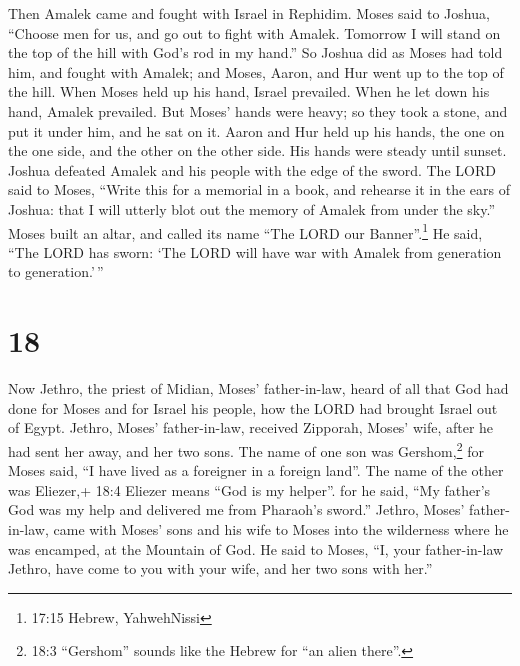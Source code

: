  Then Amalek came and fought with Israel in Rephidim.
 Moses said to Joshua, ``Choose men for us, and go out to
fight with Amalek. Tomorrow I will stand on the top of the hill with
God's rod in my hand.''  So Joshua did as Moses had told
him, and fought with Amalek; and Moses, Aaron, and Hur went up to the
top of the hill.  When Moses held up his hand, Israel
prevailed. When he let down his hand, Amalek prevailed. 
But Moses' hands were heavy; so they took a stone, and put it under him,
and he sat on it. Aaron and Hur held up his hands, the one on the one
side, and the other on the other side. His hands were steady until
sunset.  Joshua defeated Amalek and his people with the
edge of the sword.  The LORD said to Moses, ``Write this
for a memorial in a book, and rehearse it in the ears of Joshua: that I
will utterly blot out the memory of Amalek from under the sky.''
 Moses built an altar, and called its name ``The LORD our
Banner''.\footnote{17:15 Hebrew, YahwehNissi}  He said,
``The LORD has sworn: `The LORD will have war with Amalek from
generation to generation.'\,''

\hypertarget{section-17}{%
\section{18}\label{section-17}}

 Now Jethro, the priest of Midian, Moses' father-in-law,
heard of all that God had done for Moses and for Israel his people, how
the LORD had brought Israel out of Egypt.  Jethro, Moses'
father-in-law, received Zipporah, Moses' wife, after he had sent her
away,  and her two sons. The name of one son was
Gershom,\footnote{18:3 ``Gershom'' sounds like the Hebrew for ``an alien
  there''.} for Moses said, ``I have lived as a foreigner in a foreign
land''.  The name of the other was Eliezer,+ 18:4 Eliezer
means ``God is my helper''. for he said, ``My father's God was my help
and delivered me from Pharaoh's sword.''  Jethro, Moses'
father-in-law, came with Moses' sons and his wife to Moses into the
wilderness where he was encamped, at the Mountain of God. 
He said to Moses, ``I, your father-in-law Jethro, have come to you with
your wife, and her two sons with her.''

